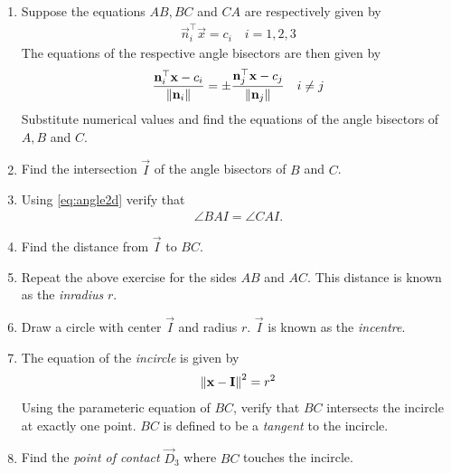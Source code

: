 \begin{enumerate}[label=\thesection.\arabic*.,ref=\thesection.\theenumi]
\item Suppose the equations $AB, BC$ and $CA$ are respectively given by 
		\begin{align}
			\label{eq:tri-sides}
			\vec{n}_i^{\top}\vec{x}=c_i \quad i = 1, 2, 3 
		\end{align}
		The equations of the respective angle bisectors are then given by 
		\begin{align}
			\frac{\mathbf{n}_i^{\top}\mathbf{x}-c_i}{\left\lVert\mathbf{n}_i\right\rVert}
		=
	\pm	\frac{\mathbf{n}_j^{\top}\mathbf{x}-c_j}{\left\lVert\mathbf{n}_j\right\rVert}
\quad i \ne j
		\end{align}
		Substitute numerical values and find the equations of the angle bisectors of $A, B$ and $C$.
	\\
  
	\item Find the intersection $\vec{I}$ of the angle bisectors of $B$ and $C$.
	\item Using 
    \eqref{eq:angle2d}
verify that 
		\begin{align}
			\angle BAI = \angle CAI.
		\end{align}
	\item Find the distance from $\vec{I}$ to $BC$.  
  \\
		 
	\item Repeat the above exercise for the sides $AB$ and $AC$.
	This distance is known as the {\em inradius} $r$.
	\item Draw a circle with center $\vec{I}$ and radius $r$.  $\vec{I}$ is known as the {\em incentre}.
	\item The equation of the {\em incircle} is given by 
		\begin{align}
			\label{eq:incircle}
			\norm{\vec{x}-\vec{I}}^2 = r^2
		\end{align}
		Using the parameteric equation of $BC$, verify that $BC$ intersects the incircle at exactly one point. $BC$ is defined to be a {\em tangent} to the incircle.
		\\
		
	\item Find the {\em point of contact} $\vec{D}_3$ where $BC$ touches the incircle.
		\\
		


\end{enumerate}

